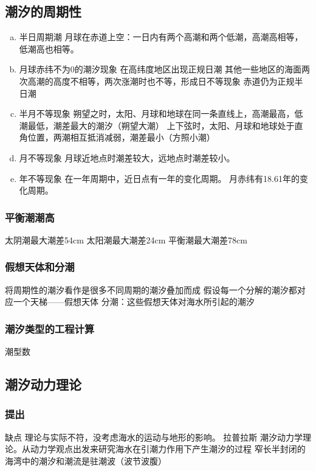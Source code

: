 				\subsection{潮汐的周期性}
				\begin{enumerate}[a)]
					\item 半日周期潮
					月球在赤道上空：一日内有两个高潮和两个低潮，高潮高相等，低潮高也相等。
					\item 月球赤纬不为0的潮汐现象
					在高纬度地区出现正规日潮
					其他一些地区的海面两次高潮的高度不相等，两次涨潮时也不等，形成日不等现象
					赤道仍为正规半日潮
					\item 半月不等现象
					朔望之时，太阳、月球和地球在同一条直线上，高潮最高，低潮最低，潮差最大的潮汐（朔望大潮）
					上下弦时，太阳、月球和地球处于直角位置，两潮相互抵消减弱，潮差最小（方照小潮）
					\item 月不等现象
					月球近地点时潮差较大，远地点时潮差较小。
					\item 年不等现象
					在一年周期中，近日点有一年的变化周期。
					月赤纬有18.61年的变化周期。
				\end{enumerate}
				\subsubsection{平衡潮潮高}
				太阴潮最大潮差54cm
				太阳潮最大潮差24cm
				平衡潮最大潮差78cm
				
				\subsubsection{假想天体和分潮}
				将周期性的潮汐看作是很多不同周期的潮汐叠加而成
				假设每一个分解的潮汐都对应一个天梯——假想天体
				分潮：这些假想天体对海水所引起的潮汐
				
				\subsubsection{潮汐类型的工程计算}
				潮型数 
				
				\subsection{潮汐动力理论}
				\subsubsection{提出}
				缺点 理论与实际不符，没考虑海水的运动与地形的影响。
				拉普拉斯 潮汐动力学理论。从动力学观点出发来研究海水在引潮力作用下产生潮汐的过程
				窄长半封闭的海湾中的潮汐和潮流是驻潮波（波节波腹）
